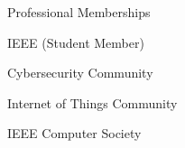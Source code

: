 
\begin{rBulletSection}[2]{Professional Memberships}

    \item IEEE (Student Member)

    \begin{rBulletList}

      \item Cybersecurity Community

      \item Internet of Things Community

    \end{rBulletList}

    \item IEEE Computer Society

    \item []

\end{rBulletSection}
